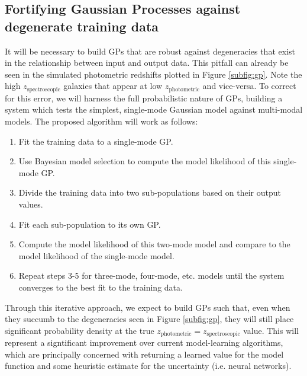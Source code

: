 \documentclass[prd,nofootbib,floatfix,11pt,tightenlines,nofootinbib]{revtex4}
\begin{document}
\subsection{Fortifying Gaussian Processes against degenerate training data}
\label{sec:multimode}

It will be necessary to build GPs that are robust against degeneracies
that exist in the relationship between input and output
data.  This pitfall can already be seen in the simulated photometric redshifts
plotted in Figure \ref{subfig:gp}.  Note the high
$z_\text{spectroscopic}$ galaxies that appear at low $z_\text{photometric}$ and
vice-versa.  To correct for this error, we will harness the full probabilistic
nature of GPs, building a system which tests the simplest, single-mode Gaussian
model against multi-modal models.  The proposed algorithm will work as
follows:
\vspace{.5\baselineskip}
\begin{enumerate}
\item Fit the training data to a single-mode GP.

\item Use Bayesian model selection \cite{mackay}
to compute the model likelihood of this single-mode GP.

\item Divide the training data into two sub-populations based on their output
values.

\item Fit each sub-population to its own GP.

\item Compute the model likelihood of this two-mode model and compare to the
model likelihood of the single-mode model.

\item Repeat steps 3-5 for three-mode, four-mode, etc. models until
  the system converges to the best fit to the training data.
\end{enumerate}

\vspace{.5\baselineskip}
Through this iterative approach, we expect to build  GPs such that, even when 
they
succumb to the degeneracies seen in Figure \ref{subfig:gp}, 
they will still place
significant probability density at the true
$z_\text{photometric}=z_\text{spectroscopic}$ value.  This will represent a
signtificant improvement over current model-learning algorithms, which are
principally concerned with returning a learned value for the model function and
some heuristic estimate for the uncertainty (i.e. neural networks).
\end{document}
